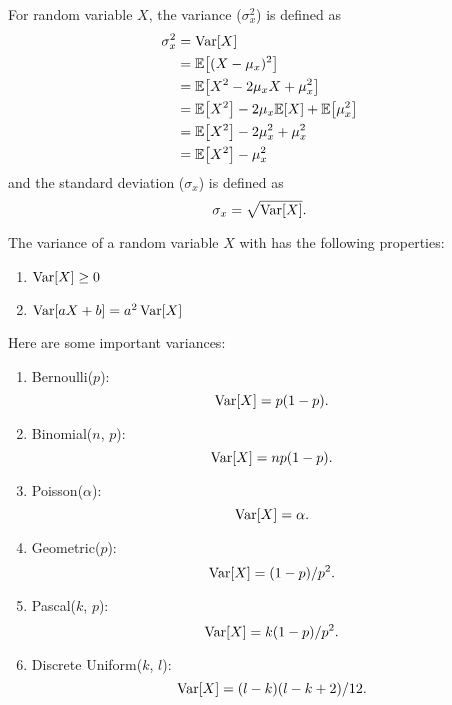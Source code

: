 \begin{definition}
    For random variable $X$, the variance ($\sigma_x^2$) is defined as
    \begin{align*}
        \sigma_x^2
        &= \Var[X] \\
        &= \E{(X-\mu_x)^2} \\
        &= \E{X^2-2\mu_x X+\mu_x^2} \\
        &= \E{X^2}-2\mu_x\E{X}+\E{\mu_x^2} \\
        &= \E{X^2}-2\mu_x^2+\mu_x^2 \\
        &= \E{X^2}-\mu_x^2
    \end{align*}
    and the standard deviation ($\sigma_x$) is defined as
    \begin{equation*}
        \sigma_x = \sqrt{\mathop{\mathrm{Var}}\nolimits[X]}.
    \end{equation*}
\end{definition}

\begin{theorem}
    The variance of a random variable $X$ with has the following properties:
    \begin{enumerate}
        \item $\mathop{\mathrm{Var}}\nolimits[X]\geq 0$
        \item $\mathop{\mathrm{Var}}\nolimits[aX+b]=a^2\mathop{\mathrm{Var}}\nolimits[X]$
    \end{enumerate}
\end{theorem}

\begin{theorem}
    Here are some important variances:
    \begin{enumerate}
        \item Bernoulli($p$): \[\mathop{\mathrm{Var}}\nolimits[X]=p(1-p).\]
        \item Binomial($n$, $p$): \[\mathop{\mathrm{Var}}\nolimits[X]=np(1-p).\]
        \item Poisson($\alpha$): \[\mathop{\mathrm{Var}}\nolimits[X]=\alpha.\]
        \item Geometric($p$): \[\mathop{\mathrm{Var}}\nolimits[X]=(1-p)/p^2.\]
        \item Pascal($k$, $p$): \[\mathop{\mathrm{Var}}\nolimits[X]=k(1-p)/p^2.\]
        \item Discrete Uniform($k$, $l$): \[\mathop{\mathrm{Var}}\nolimits[X]=(l-k)(l-k+2)/12.\]
    \end{enumerate}
\end{theorem}